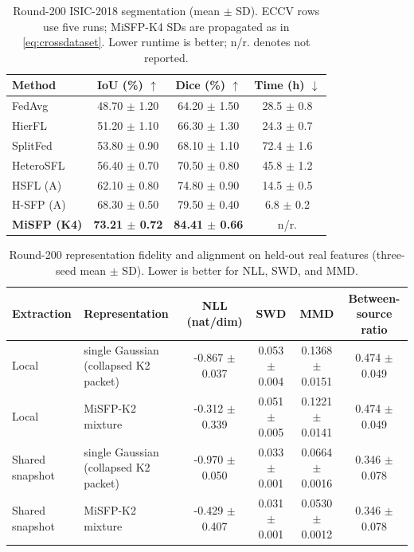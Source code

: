 \begin{table}[t]
\caption{Round-200 ISIC-2018 segmentation (mean $\pm$ SD). ECCV rows use five runs; MiSFP-K4 SDs are propagated as in \cref{eq:crossdataset}. Lower runtime is better; n/r. denotes not reported.}
\label{tab:segmentation200}
\centering\footnotesize
\setlength{\tabcolsep}{2.5pt}
\begin{tabular*}{\columnwidth}{@{\extracolsep{\fill}}lccc@{}}\toprule
Method & IoU (\%) $\uparrow$ & Dice (\%) $\uparrow$ & Time (h) $\downarrow$\\\midrule
FedAvg & 48.70 {\scriptsize $\pm$ 1.20} & 64.20 {\scriptsize $\pm$ 1.50} & 28.5 {\scriptsize $\pm$ 0.8} \\
HierFL & 51.20 {\scriptsize $\pm$ 1.10} & 66.30 {\scriptsize $\pm$ 1.30} & 24.3 {\scriptsize $\pm$ 0.7} \\
SplitFed & 53.80 {\scriptsize $\pm$ 0.90} & 68.10 {\scriptsize $\pm$ 1.10} & 72.4 {\scriptsize $\pm$ 1.6} \\
HeteroSFL & 56.40 {\scriptsize $\pm$ 0.70} & 70.50 {\scriptsize $\pm$ 0.80} & 45.8 {\scriptsize $\pm$ 1.2} \\
HSFL (A) & 62.10 {\scriptsize $\pm$ 0.80} & 74.80 {\scriptsize $\pm$ 0.90} & 14.5 {\scriptsize $\pm$ 0.5} \\
H-SFP (A) & 68.30 {\scriptsize $\pm$ 0.50} & 79.50 {\scriptsize $\pm$ 0.40} & 6.8 {\scriptsize $\pm$ 0.2} \\
\textbf{MiSFP (K4)} & \textbf{73.21 {\scriptsize $\pm$ 0.72}} & \textbf{84.41 {\scriptsize $\pm$ 0.66}} & n/r. \\
\bottomrule\end{tabular*}
\end{table}

\begin{table}[t]
\caption{Round-200 representation fidelity and alignment on held-out real features (three-seed mean $\pm$ SD). Lower is better for NLL, SWD, and MMD.}
\label{tab:fidelity}
\centering\footnotesize
\setlength{\tabcolsep}{4pt}
\begin{tabular*}{\textwidth}{@{\extracolsep{\fill}}llcccc@{}}\toprule
Extraction & Representation & NLL (nat/dim) & SWD & MMD & Between-source ratio\\\midrule
Local & single Gaussian (collapsed K2 packet) & -0.867 {\scriptsize $\pm$ 0.037} & 0.053 {\scriptsize $\pm$ 0.004} & 0.1368 {\scriptsize $\pm$ 0.0151} & 0.474 {\scriptsize $\pm$ 0.049} \\
Local & MiSFP-K2 mixture & -0.312 {\scriptsize $\pm$ 0.339} & 0.051 {\scriptsize $\pm$ 0.005} & 0.1221 {\scriptsize $\pm$ 0.0141} & 0.474 {\scriptsize $\pm$ 0.049} \\
Shared snapshot & single Gaussian (collapsed K2 packet) & -0.970 {\scriptsize $\pm$ 0.050} & 0.033 {\scriptsize $\pm$ 0.001} & 0.0664 {\scriptsize $\pm$ 0.0016} & 0.346 {\scriptsize $\pm$ 0.078} \\
Shared snapshot & MiSFP-K2 mixture & -0.429 {\scriptsize $\pm$ 0.407} & 0.031 {\scriptsize $\pm$ 0.001} & 0.0530 {\scriptsize $\pm$ 0.0012} & 0.346 {\scriptsize $\pm$ 0.078} \\
\bottomrule\end{tabular*}
\end{table}

